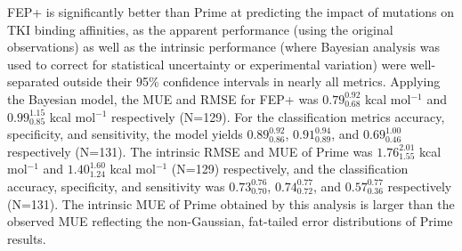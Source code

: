 \documentclass[phd,tocprelim]{cornell}
\begin{document}
FEP+ is significantly better than Prime at predicting the impact of mutations on TKI binding affinities, as the apparent performance (using the original observations) as well as the intrinsic performance (where Bayesian analysis was used to correct for statistical uncertainty or experimental variation) were well-separated outside their 95\% confidence intervals in nearly all metrics.
Applying the Bayesian model, the MUE and RMSE for FEP+ was $0.79^{0.92}_{0.68}$ kcal mol$^{-1}$ and $0.99^{1.15}_{0.85}$ kcal mol$^{-1}$ respectively (N=129). 
For the classification metrics accuracy, specificity, and sensitivity, the model yields $0.89^{0.92}_{0.86}$, $0.91^{0.94}_{0.89}$, and $0.69^{1.00}_{0.46}$ respectively (N=131).
The intrinsic RMSE and MUE of Prime was $1.76^{2.01}_{1.55}$ kcal mol$^{-1}$ and $1.40^{1.60}_{1.24}$ kcal mol$^{-1}$ (N=129) respectively, and the classification accuracy, specificity, and sensitivity was $0.73^{0.76}_{0.70}$, $0.74^{0.77}_{0.72}$, and $0.57^{0.77}_{0.36}$ respectively (N=131).
The intrinsic MUE of Prime obtained by this analysis is larger than the observed MUE reflecting the non-Gaussian, fat-tailed error distributions of Prime results.
\end{document}
